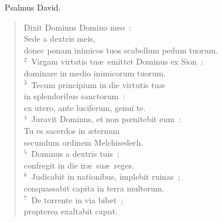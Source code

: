 ~\lettrine[lines=10,image=true,loversize=0.05,lraise=-0.03]{P}{}salmus David. \begin{flushleft}\begin{verse}\vspace{6pt}Dixit Dominus Domino meo~:\\ Sede a dextris meis,\\ donec ponam inimicos tuos scabellum pedum tuorum.\\
${}^{2}$~Virgam virtutis tu\ae\ emittet Dominus ex Sion~:\\ dominare in medio inimicorum tuorum.\\
${}^{3}$~Tecum principium in die virtutis tu\ae \\ in splendoribus sanctorum~:\\ ex utero, ante luciferum, genui te.\\
${}^{4}$~Juravit Dominus, et non pœnitebit eum~:\\ Tu es sacerdos in \ae ternum\\ secundum ordinem Melchisedech.\\
${}^{5}$~Dominus a dextris tuis~;\\ confregit in die ir\ae\ su\ae\ reges.\\
${}^{6}$~Judicabit in nationibus, implebit ruinas~;\\ conquassabit capita in terra multorum.\\
${}^{7}$~De torrente in via bibet~;\\ propterea exaltabit caput.\end{verse}\end{flushleft}


